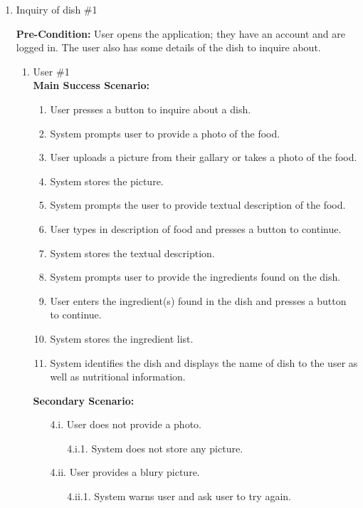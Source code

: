 \documentclass[]{article}
\begin{document}
\begin{enumerate}[{\bf BE1.}]
	\item Inquiry of dish \#1
	
	\textbf{Pre-Condition:} User opens the application; they have an account and are logged in. The user also has some details of the dish to inquire about.
		\begin{enumerate}[{\bf VP1.}]
			\item User \#1 \\
				\textbf{Main Success Scenario:} 
				\begin{enumerate}[{1.}]
					\item User presses a button to inquire about a dish.
					\item System prompts user to provide a photo of the food.
					\item User uploads a picture from their gallary or takes a photo of the food.
					\item System stores the picture.
					\item System prompts the user to provide textual description of the food.
					\item User types in description of food and presses a button to continue.
					\item System stores the textual description.
					\item System prompts user to provide the ingredients found on the dish.
					\item User enters the ingredient(s) found in the dish and presses a button to continue.
					\item System stores the ingredient list.
					\item System identifies the dish and displays the name of dish to the user as well as nutritional information.
				\end{enumerate}
				\textbf{Secondary Scenario:}
				\begin{enumerate}
					\item[4.i.] User does not provide a photo.
					\begin{enumerate}
						\item[4.i.1.] System does not store any picture.
					\end{enumerate}
					\item[4.ii.] User provides a blury picture.
					\begin{enumerate}
						\item[4.ii.1.] System warns user and ask user to try again.
					\end{enumerate}

\end{enumerate}
\end{enumerate}
\end{enumerate}
\end{document}
